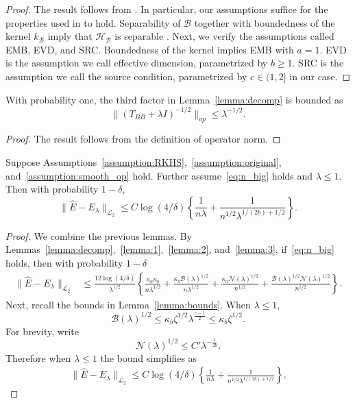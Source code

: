 \begin{proof}
The result follows from \cite[eq. 44b, 47]{fischer2017sobolev}. In particular, our assumptions suffice for the properties used in \cite[Lemma 17]{fischer2017sobolev} to hold. Separability of $\mathcal{B}$ together with boundedness of the kernel $k_{\mathcal{B}}$ imply that $\mathcal{H}_{\mathcal{B}}$ is separable \cite[Lemma 4.33]{steinwart2008support}. Next, we verify the assumptions called EMB, EVD, and SRC. Boundedness of the kernel implies EMB with $a=1$. EVD is the assumption we call effective dimension, parametrized by $b\geq 1$. SRC is the assumption we call the source condition, parametrized by $c\in(1,2]$ in our case. 
\end{proof}


\begin{lemma}\label{lemma:3}
With probability one, the third factor in Lemma~\ref{lemma:decomp} is bounded as
$$
    \|(T_{BB}+\lambda I)^{-1/2}\|_{op} \leq \lambda^{-1/2}.
$$
\end{lemma}

\begin{proof}
The result follows from the definition of operator norm.
\end{proof}

\begin{proposition}\label{prop:variance}
Suppose Assumptions~\ref{assumption:RKHS},~\ref{assumption:original}, and~\ref{assumption:smooth_op} hold. Further assume~\eqref{eq:n_big} holds and $\lambda\leq 1$. Then with probability $1-\delta$,
$$
\|\hat{E}-E_{\lambda}\|_{\mathcal{L}_2} \leq C\log(4/\delta)\left\{ \frac{1}{n\lambda}+\frac{1}{n^{1/2}\lambda^{1/(2b)+1/2}}\right\}.
$$
\end{proposition}

\begin{proof}
We combine the previous lemmas. By Lemmas~\ref{lemma:decomp},~\ref{lemma:1},~\ref{lemma:2}, and~\ref{lemma:3}, if~\eqref{eq:n_big} holds, then with probability $1-\delta$
\begin{align*}
    \|\hat{E}-E_{\lambda}\|_{\mathcal{L}_2} 
    &\leq \frac{12\log(4/\delta) }{\lambda^{1/2}} \left\{\frac{\kappa_a\kappa_b}{n\lambda^{1/2}}+\frac{\kappa_b\mathcal{B}(\lambda)^{1/2}}{n\lambda^{1/2}}+\frac{\kappa_a \mathcal{N}(\lambda)^{1/2}}{n^{1/2}}+\frac{\mathcal{B}(\lambda)^{1/2}\mathcal{N}(\lambda)^{1/2}}{n^{1/2}}\right\}.
\end{align*}
Next, recall the bounds in Lemma~\ref{lemma:bounds}. When $\lambda\leq 1$,
     $$
     \mathcal{B}(\lambda)^{1/2} \leq \kappa_b \zeta^{1/2} \lambda^{\frac{c-1}{2}} \leq \kappa_b \zeta^{1/2}.
     $$
     For brevity, write
     $$
     \mathcal{N}(\lambda)^{1/2}\leq C'\lambda^{-\frac{1}{2b}}.
     $$
     Therefore when $\lambda\leq 1$ the bound simplifies as
     \begin{align*}
         \|\hat{E}-E_{\lambda}\|_{\mathcal{L}_2} 
    \leq C\log(4/\delta) \left\{\frac{1}{n\lambda}+\frac{1}{n^{1/2}\lambda^{1/(2b)+1/2}}\right\}.
     \end{align*}
\end{proof}


